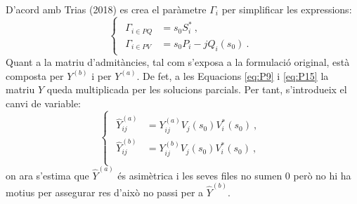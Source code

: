D'acord amb Trias (2018) es crea el paràmetre $\Gamma_i$ per simplificar les expressions:
\begin{equation}
    \begin{cases}
    \begin{split}
    \Gamma_{i\in PQ}&=s_0S^{*}_i\ ,\\
    \Gamma_{i\in PV}&=s_0P_i-jQ_i(s_0)\ .
    \end{split}
\end{cases}
    \label{eq:C4}
\end{equation}
Quant a la matriu d'admitàncies, tal com s'exposa a la formulació original, està composta per $Y^{(b)}$ i per $Y^{(a)}$. De fet, a les Equacions \ref{eq:P9} i \ref{eq:P15} la matriu $Y$ queda multiplicada per les solucions parcials. Per tant, s'introdueix el canvi de variable:
\begin{equation}
    \begin{cases}
    \begin{split}
        \widehat{Y}^{(a)}_{ij} &= {Y}^{(a)}_{ij}V_j(s_0)V^*_i(s_0)\ ,\\
        \widehat{Y}^{(b)}_{ij} &= {Y}^{(b)}_{ij}V_j(s_0)V^*_i(s_0)\ ,\\
    \end{split}
\end{cases}
    \label{eq:sy1}
\end{equation}
on ara s'estima que $\widehat{Y}^{(a)}$ és asimètrica i les seves files no sumen 0 però no hi ha motius per assegurar res d'això no passi per a $\widehat{Y}^{(b)}$. 

